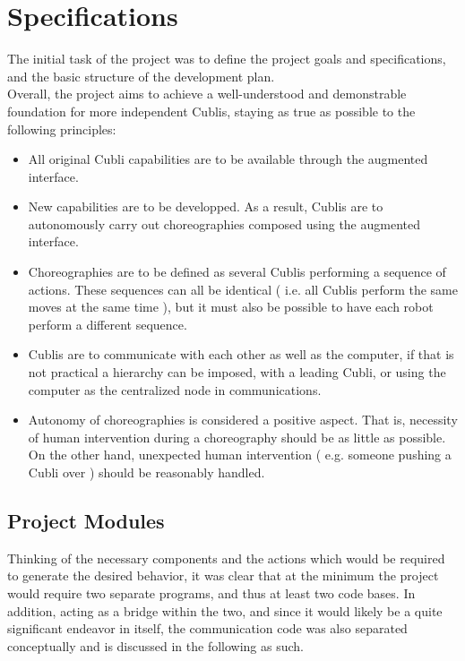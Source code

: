 \chapter{Specifications}\label{sec:specifications}

The initial task of the project was to define the project goals and specifications, and the basic structure of the development plan.\\ 

Overall, the project aims to achieve a well-understood and demonstrable foundation for more independent Cublis, staying as true as possible to the following principles:

\begin{itemize}

\item[] All original Cubli capabilities are to be available through the augmented interface.

\item[] New capabilities are to be developped. As a result, Cublis are to autonomously carry out choreographies composed using the augmented interface.

\item[] Choreographies are to be defined as several Cublis performing a sequence of actions. These sequences can all be identical ( i.e. all Cublis perform the same moves at the same time ), but it must also be possible to have each robot perform a different sequence.

\item[] Cublis are to communicate with each other as well as the computer, if that is not practical a hierarchy can be imposed, with a leading Cubli, or using the computer as the centralized node in communications.

\item[] Autonomy of choreographies is considered a positive aspect. That is, necessity of human intervention during a choreography should be as little as possible. On the other hand,  unexpected human intervention ( e.g. someone pushing a Cubli over ) should be reasonably handled.

\end{itemize}




\section{Project Modules}

Thinking of the necessary components and the actions which would be required to generate the desired behavior, it was clear that at the minimum the project would require two separate programs, and thus at least two code bases. In addition, acting as a bridge within the two, and since it would likely be a quite significant endeavor in itself, the communication code was also separated conceptually and is discussed in the following as such.\\ 

